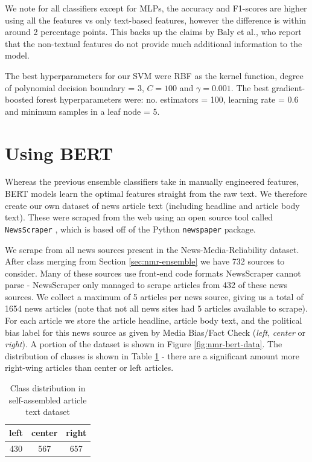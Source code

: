 We note for all classifiers except for MLPs, the accuracy and F1-scores are higher using all the features vs only text-based features, however the difference is within around 2 percentage points. This backs up the claims by Baly et al., who report that the non-textual features do not provide much additional information to the model.

The best hyperparameters for our SVM were RBF as the kernel function, degree of polynomial decision boundary = 3, $ C = 100 $ and $ \gamma = 0.001 $. The best gradient-boosted forest hyperparameters were: no. estimators = 100, learning rate = 0.6 and minimum samples in a leaf node = 5.

\section{Using BERT} \label{sec:nmr-bert}

Whereas the previous ensemble classifiers take in manually engineered features, BERT models learn the optimal features straight from the raw text. We therefore create our own dataset of news article text (including headline and article body text). These were scraped from the web using an open source tool called \texttt{NewsScraper} \cite{newsscraper}, which is based off of the Python \texttt{newspaper} \cite{newspaper-python} package.

We scrape from all news sources present in the News-Media-Reliability dataset. After class merging from Section \ref{sec:nmr-ensemble} we have 732 sources to consider. Many of these sources use front-end code formats NewsScraper cannot parse - NewsScraper only managed to scrape articles from 432 of these news sources. We collect a maximum of 5 articles per news source, giving us a total of 1654 news articles (note that not all news sites had 5 articles available to scrape). For each article we store the article headline, article body text, and the political bias label for this news source as given by Media Bias/Fact Check (\textit{left}, \textit{center} or \textit{right}). A portion of the dataset is shown in Figure \ref{fig:nmr-bert-data}. The distribution of classes is shown in Table \ref{tab:nmr-bert-data-classes} - there are a significant amount more right-wing articles than center or left articles.

\begin{table}[h]
    \centering
    \begin{tabular}{|c|c|c|}
        \hline
        left & center & right \\
        \hline
        430 & 567 & 657 \\
        \hline
    \end{tabular}
    \caption{Class distribution in self-assembled article text dataset}
    \label{tab:nmr-bert-data-classes}
\end{table}

